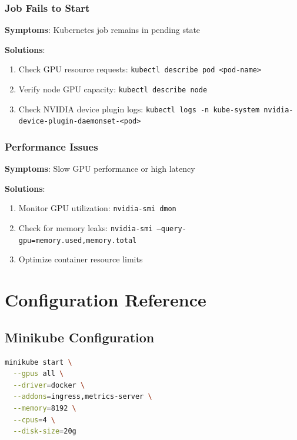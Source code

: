 \documentclass[12pt,a4paper]{report}
\begin{document}
\subsubsection{Job Fails to Start}
\textbf{Symptoms}: Kubernetes job remains in pending state

\textbf{Solutions}:
\begin{enumerate}
    \item Check GPU resource requests: \texttt{kubectl describe pod <pod-name>}
    \item Verify node GPU capacity: \texttt{kubectl describe node}
    \item Check NVIDIA device plugin logs: \texttt{kubectl logs -n kube-system nvidia-device-plugin-daemonset-<pod>}
\end{enumerate}

\subsubsection{Performance Issues}
\textbf{Symptoms}: Slow GPU performance or high latency

\textbf{Solutions}:
\begin{enumerate}
    \item Monitor GPU utilization: \texttt{nvidia-smi dmon}
    \item Check for memory leaks: \texttt{nvidia-smi --query-gpu=memory.used,memory.total}
    \item Optimize container resource limits
\end{enumerate}

\section{Configuration Reference}
\label{sec:config-reference}

\subsection{Minikube Configuration}
\begin{lstlisting}[language=bash,caption=Advanced Minikube Configuration,label=lst:minikube-config]
minikube start \
  --gpus all \
  --driver=docker \
  --addons=ingress,metrics-server \
  --memory=8192 \
  --cpus=4 \
  --disk-size=20g
\end{lstlisting}
\end{document}
